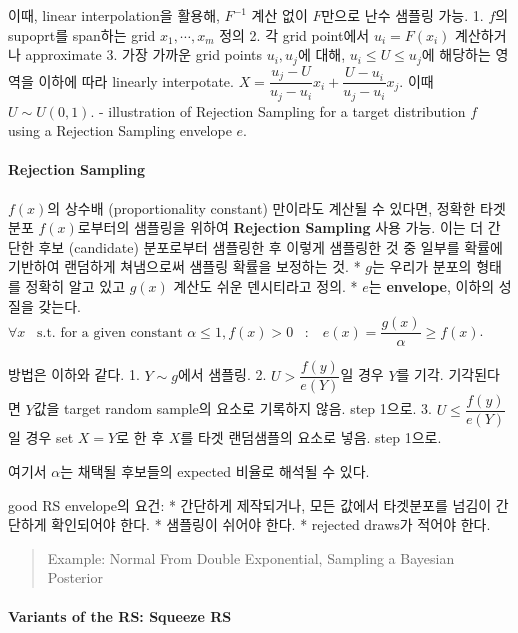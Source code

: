 \documentclass[
]{book}
\begin{document}
이때, linear interpolation을 활용해, \(F^{-1}\) 계산 없이 \(F\)만으로 난수 샘플링 가능.
1. \(f\)의 supoprt를 span하는 grid \(x_1 , \cdots, x_m\) 정의
2. 각 grid point에서 \(u_i = F(x_i)\) 계산하거나 approximate
3. 가장 가까운 grid points \(u_i , u_j\)에 대해, \(u_i \le U \le u_j\)에 해당하는 영역을 이하에 따라 linearly interpotate. \(X = \dfrac{u_j-U}{u_j - u_i}x_i + \dfrac{U-u_i}{u_j - u_i}x_j\). 이때 \(U \sim U(0, 1)\).
- illustration of Rejection Sampling for a target distribution \(f\) using a Rejection Sampling envelope \(e\).

\hypertarget{rejection-sampling}{%
\paragraph{Rejection Sampling}\label{rejection-sampling}}

\(f(x)\)의 상수배 (proportionality constant) 만이라도 계산될 수 있다면, 정확한 타겟분포 \(f(x)\)로부터의 샘플링을 위하여 \textbf{Rejection Sampling} 사용 가능. 이는 더 간단한 후보 (candidate) 분포로부터 샘플링한 후 이렇게 샘플링한 것 중 일부를 확률에 기반하여 랜덤하게 쳐냄으로써 샘플링 확률을 보정하는 것.
* \(g\)는 우리가 분포의 형태를 정확히 알고 있고 \(g(x)\) 계산도 쉬운 덴시티라고 정의.
* \(e\)는 \textbf{envelope}, 이하의 성질을 갖는다. \(\forall x \; \; \; \text{s.t. for a given constant } \alpha \le 1, f(x)>0 \; \; \; : \; \; \; e(x) = \dfrac {g(x)}{\alpha} \ge f(x)\).

방법은 이하와 같다.
1. \(Y \sim g\)에서 샘플링.
2. \(U>\dfrac {f(y)}{e(Y)}\)일 경우 \(Y\)를 기각. 기각된다면 \(Y\)값을 target random sample의 요소로 기록하지 않음. step 1으로.
3. \(U \le \dfrac {f(y)}{e(Y)}\)일 경우 set \(X=Y\)로 한 후 \(X\)를 타겟 랜덤샘플의 요소로 넣음. step 1으로.

여기서 \(\alpha\)는 채택될 후보들의 expected 비율로 해석될 수 있다.

good RS envelope의 요건:
* 간단하게 제작되거나, 모든 값에서 타겟분포를 넘김이 간단하게 확인되어야 한다.
* 샘플링이 쉬어야 한다.
* rejected draws가 적어야 한다.

\begin{quote}
Example: Normal From Double Exponential, Sampling a Bayesian Posterior
\end{quote}

\hypertarget{variants-of-the-rs-squeeze-rs}{%
\paragraph{Variants of the RS: Squeeze RS}\label{variants-of-the-rs-squeeze-rs}}
\end{document}
